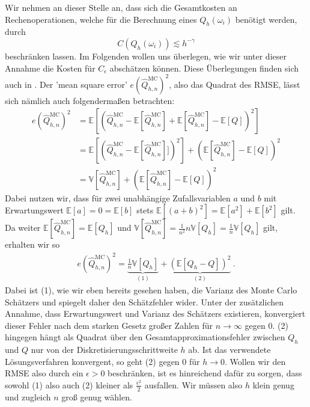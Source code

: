 Wir nehmen an dieser Stelle an, dass sich die Gesamtkosten an Rechenoperationen, welche für die Berechnung eines $ Q_h(\omega_i) $ benötigt werden, durch
 \[
 	C(Q_h(\omega_i))  \lesssim h^{- \gamma}
 \] beschränken lassen.
 Im Folgenden wollen uns überlegen, wie wir unter dieser Annahme die Kosten für $ C_{\epsilon} $ abschätzen können. Diese Überlegungen finden sich auch in \cite{cliffe2011multilevel}.
 Der 'mean square error' $ e(\widehat{Q}_{h,n}^{\text{MC}})^2 $, also das Quadrat des RMSE, lässt sich nämlich auch folgendermaßen betrachten:
 \begin{align}
 \label{badumts}
 	e(\widehat{Q}_{h,n}^{\text{MC}})^2 &= \mathbb{E} \left[ \left( \widehat{Q}_{h,n}^{\text{MC}} -  \mathbb{E}[\widehat{Q}_{h,n}^{\text{MC}}] + \mathbb{E}[\widehat{Q}_{h,n}^{\text{MC}}] - \mathbb{E}[Q] \right)^2 \right] \nonumber \\
 	&= \mathbb{E} \left[ ( \widehat{Q}_{h,n}^{\text{MC}} -    \mathbb{E}[\widehat{Q}_{h,n}^{\text{MC}}]])^2 \right] + \left( \mathbb{E}[\widehat{Q}_{h,n}^{\text{MC}}] - \mathbb{E}[Q] \right)^2 \nonumber \\
 	&= \mathbb{V}[\widehat{Q}_{h,n}^{\text{MC}}] + \left( \mathbb{E}[\widehat{Q}_{h,n}^{\text{MC}}] - \mathbb{E}[Q] \right)^2
 \end{align}
 Dabei nutzen wir, dass für zwei unabhängige Zufallsvariablen $ a $ und $ b $ mit Erwartungswert $ \mathbb{E}[a] = 0 = \mathbb{E}[b] $ stets $ \mathbb{E}[(a+b)^2] = \mathbb{E}[a^2]+\mathbb{E}[b^2] $ gilt.
 Da weiter $ \mathbb{E}[\widehat{Q}_{h,n}^{\text{MC}}] = \mathbb{E}[Q_h] $ und $ \mathbb{V}[\widehat{Q}_{h,n}^{\text{MC}}] = \frac{1}{n^2} n \mathbb{V}[Q_h] = \frac{1}{n}  \mathbb{V}[Q_h] $ gilt, erhalten wir so 
 \begin{align}
 \label{mseMC}
	 e(\widehat{Q}_{h,n}^{\text{MC}})^2 = \underbrace{\frac{1}{n}  \mathbb{V}[Q_h]}_{(1)} + \underbrace{(\mathbb{E}[Q_h - Q])^2}_{(2)} \ .
 \end{align}
 Dabei ist (1), wie wir eben bereits gesehen haben, die Varianz des Monte Carlo Schätzers und spiegelt daher den Schätzfehler wider. Unter der zusätzlichen Annahme, dass Erwartungswert und Varianz des Schätzers existieren, konvergiert dieser Fehler nach dem starken Gesetz großer Zahlen für $ n \to \infty $ gegen $ 0 $.
 (2) hingegen hängt als Quadrat über den Gesamtapproximationsfehler zwischen $ Q_h $
 und $ Q $ nur von der Diskretisierungsschrittweite $ h $ ab. Ist das verwendete Lösungsverfahren konvergent, so geht (2) gegen $ 0 $ für $ h \to 0 $.
 Wollen wir den RMSE also durch ein $ \epsilon > 0 $ beschränken, ist es hinreichend dafür zu sorgen, dass sowohl (1) also auch (2) kleiner als $ \frac{\epsilon^2}{2} $ ausfallen. Wir müssen also $ h $ klein genug und zugleich $ n $ groß genug wählen.
